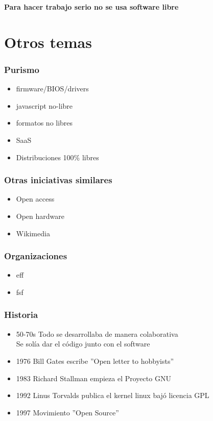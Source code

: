 \documentclass{beamer}
\begin{document}
\begin{frame}
    \begin{center}
        \textbf{Para hacer trabajo serio no se usa software libre}
    \end{center}
\end{frame}

\section{Otros temas}

\begin{frame}\frametitle{Purismo}
    \begin{itemize}
        \item firmware/BIOS/drivers
        \item javascript no-libre
        \item formatos no libres
        \item SaaS
        \item Distribuciones 100\% libres
    \end{itemize}
\end{frame}

\begin{frame}\frametitle{Otras iniciativas similares}
    \begin{itemize}
        \item Open access
        \item Open hardware
        \item Wikimedia
    \end{itemize}
\end{frame}

\begin{frame}\frametitle{Organizaciones}
    \begin{itemize}
        \item eff
        \item fsf
    \end{itemize}
\end{frame}

\begin{frame}\frametitle{Historia}
    \begin{itemize}
        \item 50-70s Todo se desarrollaba de manera colaborativa \\
              Se solía dar el código junto con el software
        \item 1976 Bill Gates escribe ''Open letter to hobbyists''
        \item 1983 Richard Stallman empieza el Proyecto GNU
        \item 1992 Linus Torvalds publica el kernel linux bajó licencia GPL
        \item 1997 Movimiento ''Open Source''
    \end{itemize}
\end{frame}
\end{document}
